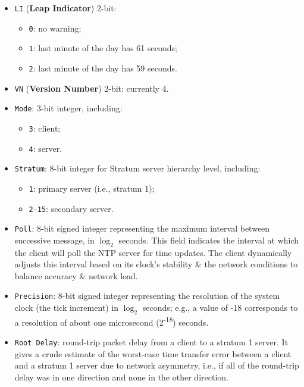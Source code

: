 \documentclass[a4paper,11pt]{article}
\begin{document}
\begin{itemize}
    \item   \verb|LI| (\textbf{Leap Indicator}) 2-bit:
            \begin{itemize}
                \item   \verb|0|: no warning;
                \item   \verb|1|: last minute of the day has 61 seconds;
                \item   \verb|2|: last minute of the day has 59 seconds.
            \end{itemize}


    \item   \verb|VN| (\textbf{Version Number}) 2-bit: currently 4. 

    \item   \verb|Mode|: 3-bit integer, including:
            \begin{itemize}
                \item   \verb|3|: client;
                \item   \verb|4|: server.
            \end{itemize}

    \item   \verb|Stratum|: 8-bit integer for Stratum server hierarchy level, including:
            \begin{itemize}
                \item   \verb|1|: primary server (i.e., stratum 1);
                \item   \verb|2|–\verb|15|: secondary server.
            \end{itemize}

    \item   \verb|Poll|: 8-bit signed integer representing the maximum interval between successive message, in $\log_2$ seconds.
            This field indicates the interval at which the client will poll the NTP server for time updates.
            The client dynamically adjusts this interval based on its clock's stability \& the network conditions to balance accuracy \& network load.

    \item   \verb|Precision|: 8-bit signed integer representing the resolution of the system clock (the tick increment) in $\log_2$ seconds;
            e.g., a value of -18 corresponds to a resolution of about one microsecond (2\textsuperscript{-18}) seconds.

    \item   \verb|Root Delay|: round-trip packet delay from a client to a stratum 1 server.
            It gives a crude estimate of the worst-case time transfer error between a client and a stratum 1 server due to network asymmetry, i.e., if all of the round-trip delay was in one direction and none in the other direction.
\end{itemize}
\end{document}

